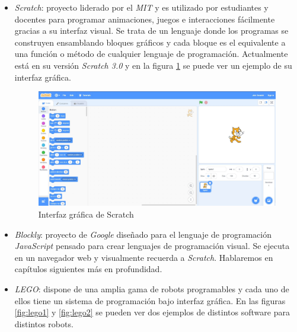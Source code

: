 \begin{itemize}
    \item \textit{Scratch}: proyecto liderado por el \textit{MIT} y es utilizado por estudiantes y docentes para programar animaciones, juegos e interacciones fácilmente gracias a su interfaz visual. Se trata de un lenguaje donde los programas se construyen ensamblando bloques gráficos y cada bloque es el equivalente a una función o método de cualquier lenguaje de programación. Actualmente está en su versión \textit{Scratch 3.0} y en la figura \ref{fig:scratch} se puede ver un ejemplo de su interfaz gráfica. 
    \begin{figure}[H]
    \centering
    \includegraphics[width=1\textwidth]{img/scratch.jpg}
    \caption{Interfaz gráfica de Scratch} \label{fig:scratch}
    \end{figure}
    
    \item \textit{Blockly}: proyecto de \textit{Google} diseñado para el lenguaje de programación \textit{JavaScript} pensado para crear lenguajes de programación visual. Se ejecuta en un navegador web y visualmente recuerda a \textit{Scratch}. Hablaremos en capítulos siguientes más en profundidad. 
    
    \item \textit{LEGO}: dispone de una amplia gama de robots programables y cada uno de ellos tiene un sistema de programación bajo interfaz gráfica. En las figuras \ref{fig:lego1} y \ref{fig:lego2} se pueden ver dos ejemplos de distintos software para distintos robots.  
    

\end{itemize}
